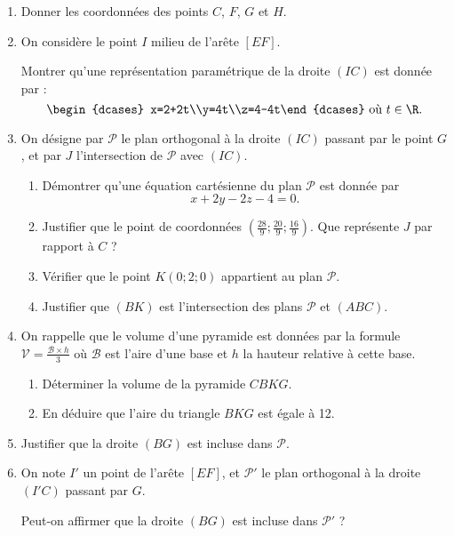 \begin{enumerate}
	\item Donner les coordonnées des points $C$, $F$, $G$ et $H$.
	\item On considère le point $I$ milieu de l’arête $[EF]$.
	
	Montrer qu’une représentation paramétrique de la droite $(IC)$ est donnée par : \[ \begin{dcases} x=2+2t\\y=4t\\z=4-4t\end{dcases} \text{ où } t \in \R. \]
	\item On désigne par $\mathcal{P}$ le plan orthogonal à la droite $(IC)$ passant par le point $G$, et par $J$ l'intersection de $\mathcal{P}$ avec $(IC)$.
	\begin{enumerate}
		\item Démontrer qu'une équation cartésienne du plan $\mathcal{P}$ est donnée par \[ x+2y-2z-4=0. \]
		\item Justifier que le point de coordonnées $\left(\frac{28}{9};\frac{20}{9};\frac{16}{9}\right)$. Que représente $J$ par rapport à $C$ ?
		\item Vérifier que le point $K(0;2;0)$ appartient au plan $\mathcal{P}$.
		\item Justifier que $(BK)$ est l'intersection des plans $\mathcal{P}$ et $(ABC)$.
	\end{enumerate}
	\item On rappelle que le volume d'une pyramide est données par la formule $\mathcal{V}=\frac{\mathcal{B}\times h}{3}$ où $\mathcal{B}$ est l'aire d'une base et $h$ la hauteur relative à cette base.
	\begin{enumerate}
		\item Déterminer la volume de la pyramide $CBKG$.
		\item En déduire que l'aire du triangle $BKG$ est égale à 12.
	\end{enumerate}
	\item Justifier que la droite $(BG)$ est incluse dans $\mathcal{P}$.
	\item On note $I'$ un point de l'arête $[EF]$, et $\mathcal{P}'$ le plan orthogonal à la droite $(I'C)$ passant par $G$.
	
	Peut-on affirmer que la droite $(BG)$ est incluse dans $\mathcal{P}'$ ?
\end{enumerate}